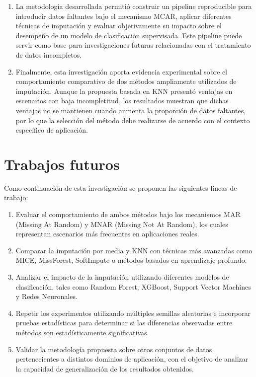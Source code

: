 \begin{enumerate}
\item La metodología desarrollada permitió construir un pipeline reproducible para introducir datos faltantes bajo el mecanismo MCAR, aplicar diferentes técnicas de imputación y evaluar objetivamente su impacto sobre el desempeño de un modelo de clasificación supervisada. Este pipeline puede servir como base para investigaciones futuras relacionadas con el tratamiento de datos incompletos.

\item Finalmente, esta investigación aporta evidencia experimental sobre el comportamiento comparativo de dos métodos ampliamente utilizados de imputación. Aunque la propuesta basada en KNN presentó ventajas en escenarios con baja incompletitud, los resultados muestran que dichas ventajas no se mantienen cuando aumenta la proporción de datos faltantes, por lo que la selección del método debe realizarse de acuerdo con el contexto específico de aplicación.

\end{enumerate}

\section{Trabajos futuros}

Como continuación de esta investigación se proponen las siguientes líneas de trabajo:

\begin{enumerate}

\item Evaluar el comportamiento de ambos métodos bajo los mecanismos MAR (Missing At Random) y MNAR (Missing Not At Random), los cuales representan escenarios más frecuentes en aplicaciones reales.

\item Comparar la imputación por media y KNN con técnicas más avanzadas como MICE, MissForest, SoftImpute o métodos basados en aprendizaje profundo.

\item Analizar el impacto de la imputación utilizando diferentes modelos de clasificación, tales como Random Forest, XGBoost, Support Vector Machines y Redes Neuronales.

\item Repetir los experimentos utilizando múltiples semillas aleatorias e incorporar pruebas estadísticas para determinar si las diferencias observadas entre métodos son estadísticamente significativas.

\item Validar la metodología propuesta sobre otros conjuntos de datos pertenecientes a distintos dominios de aplicación, con el objetivo de analizar la capacidad de generalización de los resultados obtenidos.

\end{enumerate}
